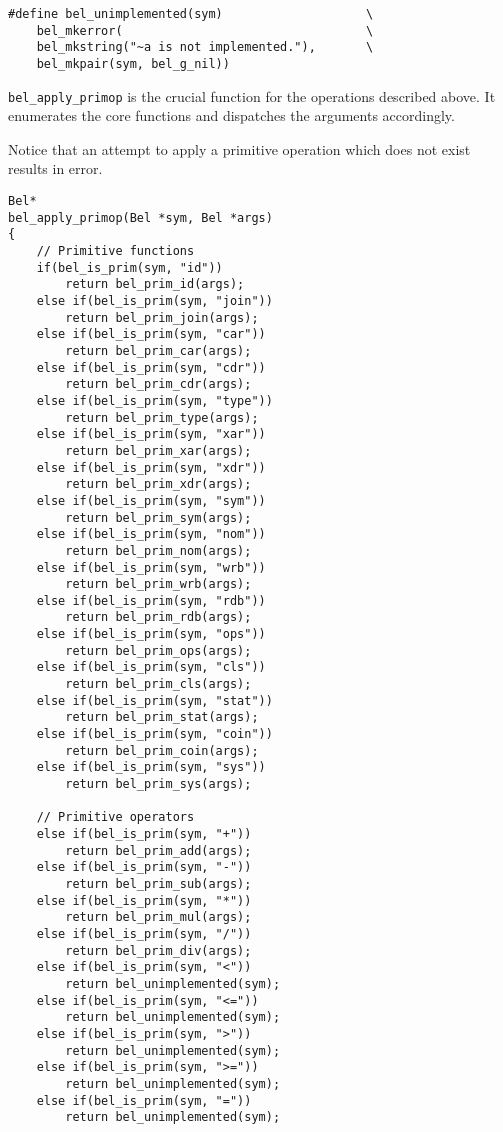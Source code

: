\documentclass[openright,a4paper,twoside,12pt]{memoir}
\begin{document}
\begin{enumerate}
\begin{verbatim}
#define bel_unimplemented(sym)                    \
    bel_mkerror(                                  \
    bel_mkstring("~a is not implemented."),       \
    bel_mkpair(sym, bel_g_nil))
\end{verbatim}

\texttt{bel\_apply\_primop} is the crucial function for the operations described
above. It enumerates the core functions and dispatches the arguments
accordingly.

Notice that an attempt to apply a primitive operation which does not
exist results in error.

\begin{verbatim}
Bel*
bel_apply_primop(Bel *sym, Bel *args)
{
    // Primitive functions
    if(bel_is_prim(sym, "id"))
        return bel_prim_id(args);
    else if(bel_is_prim(sym, "join"))
        return bel_prim_join(args);
    else if(bel_is_prim(sym, "car"))
        return bel_prim_car(args);
    else if(bel_is_prim(sym, "cdr"))
        return bel_prim_cdr(args);
    else if(bel_is_prim(sym, "type"))
        return bel_prim_type(args);
    else if(bel_is_prim(sym, "xar"))
        return bel_prim_xar(args);
    else if(bel_is_prim(sym, "xdr"))
        return bel_prim_xdr(args);
    else if(bel_is_prim(sym, "sym"))
        return bel_prim_sym(args);
    else if(bel_is_prim(sym, "nom"))
        return bel_prim_nom(args);
    else if(bel_is_prim(sym, "wrb"))
        return bel_prim_wrb(args);
    else if(bel_is_prim(sym, "rdb"))
        return bel_prim_rdb(args);
    else if(bel_is_prim(sym, "ops"))
        return bel_prim_ops(args);
    else if(bel_is_prim(sym, "cls"))
        return bel_prim_cls(args);
    else if(bel_is_prim(sym, "stat"))
        return bel_prim_stat(args);
    else if(bel_is_prim(sym, "coin"))
        return bel_prim_coin(args);
    else if(bel_is_prim(sym, "sys"))
        return bel_prim_sys(args);

    // Primitive operators
    else if(bel_is_prim(sym, "+"))
        return bel_prim_add(args);
    else if(bel_is_prim(sym, "-"))
        return bel_prim_sub(args);
    else if(bel_is_prim(sym, "*"))
        return bel_prim_mul(args);
    else if(bel_is_prim(sym, "/"))
        return bel_prim_div(args);
    else if(bel_is_prim(sym, "<"))
        return bel_unimplemented(sym);
    else if(bel_is_prim(sym, "<="))
        return bel_unimplemented(sym);
    else if(bel_is_prim(sym, ">"))
        return bel_unimplemented(sym);
    else if(bel_is_prim(sym, ">="))
        return bel_unimplemented(sym);
    else if(bel_is_prim(sym, "="))
        return bel_unimplemented(sym);
    

\end{verbatim}
\end{enumerate}
\end{document}

